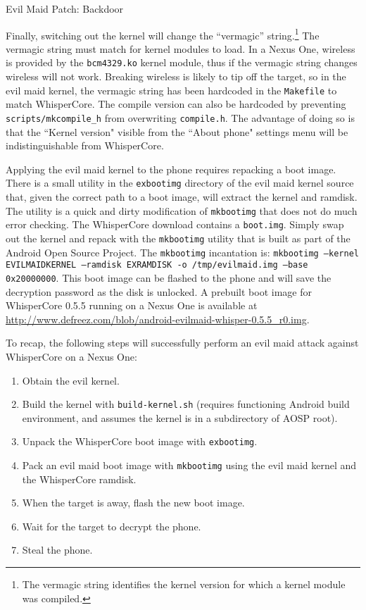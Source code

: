 \begin{table}[htb]

\caption{Evil Maid Patch: Backdoor}
\label{tab:backdoor}
\end{table}

Finally, switching out the kernel will change the ``vermagic'' string.\footnote{The vermagic string identifies the kernel version
for which a kernel module was compiled.} The vermagic string must match for kernel modules to load.  In a Nexus One, wireless is
provided by the \texttt{bcm4329.ko} kernel module, thus if the vermagic string changes wireless will not work.  Breaking wireless is
likely to tip off the target, so in the evil maid kernel, the vermagic string has been hardcoded in the \texttt{Makefile} to match
WhisperCore.  The compile version can also be hardcoded by preventing \texttt{scripts/mkcompile\_h} from overwriting
\texttt{compile.h}.  The advantage of doing so is that the ``Kernel version" visible from the ``About phone" settings menu will be
indistinguishable from WhisperCore.

Applying the evil maid kernel to the phone requires repacking a boot image.  There is a small utility in the \texttt{exbootimg}
directory of the evil maid kernel source that, given the correct path to a boot image, will extract the kernel and ramdisk.  The
utility is a quick and dirty modification of \texttt{mkbootimg} that does not do much error checking.  The WhisperCore download
contains a \texttt{boot.img}.  Simply swap out the kernel and repack with the \texttt{mkbootimg} utility that is built as part of the Android Open
Source Project.  The \texttt{mkbootimg} incantation is: \texttt{mkbootimg --kernel EVILMAIDKERNEL --ramdisk EXRAMDISK -o
/tmp/evilmaid.img --base 0x20000000}.  This boot image can be flashed to the phone and will save the decryption password as the disk
is unlocked.  A prebuilt boot image for WhisperCore 0.5.5 running on a Nexus One is available at
\url{http://www.defreez.com/blob/android-evilmaid-whisper-0.5.5_r0.img}.

To recap, the following steps will successfully perform an evil maid attack against WhisperCore on a Nexus One:

\begin{enumerate}
	\item{Obtain the evil kernel.}
	\item{Build the kernel with \texttt{build-kernel.sh} (requires functioning Android build environment, and assumes
		the kernel is in a subdirectory of AOSP root).}
	\item{Unpack the WhisperCore boot image with \texttt{exbootimg}.}
	\item{Pack an evil maid boot image with \texttt{mkbootimg} using the evil maid kernel and the WhisperCore ramdisk.}
	\item{When the target is away, flash the new boot image.}
	\item{Wait for the target to decrypt the phone.}
	\item{Steal the phone.}
\end{enumerate}

